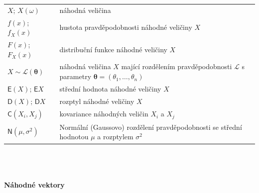\documentclass[a4paper,12pt]{report}
\theoremstyle{definition} \newtheorem{definice}[veta]{Definice}
\theoremstyle{remark}
\begin{document}
   \begin{tabular}{p{4cm} p{9.3cm}}
   $X$; $X(\omega)$                                                 &   náhodná veličina \\
   $f(x)$; $f_X(x)$                                               &   hustota pravděpodobnosti náhodné veličiny $X$ \\ %
   $F(x)$; $F_X(x)$				 &  distribuční funkce náhodné veličiny $X$ \\
   $X\sim \mathcal{L}(\boldsymbol{\theta})$                                &   náhodná veličina $X$ mající rozdělením pravděpodobnosti $\mathcal{L}$ s parametry  $\boldsymbol{\theta}=(\theta_1,\ldots,\theta_n)$ \\ %
   $\mathsf{E}(X)$;  $\mathsf{E}X$                         	      &   střední hodnota náhodné veličiny $X$ \\
   $\mathsf{D}(X)$;  $\mathsf{D}X$                       	      &   rozptyl náhodné veličiny $X$ \\
   $\mathsf{C}(X_i,X_j)$             		      &   kovariance náhodných veličin $X_i$ a $X_j$\\
   $\mathsf{N}(\mu, \sigma^{2})$                      &   Normální (Gaussovo) rozdělení pravděpodobnosti se střední hodnotou $\mu$ a rozptylem $\sigma^2$  \\
   \end{tabular}\\\\\\
%
%
\textbf{Náhodné vektory}\\\\
\end{document}
